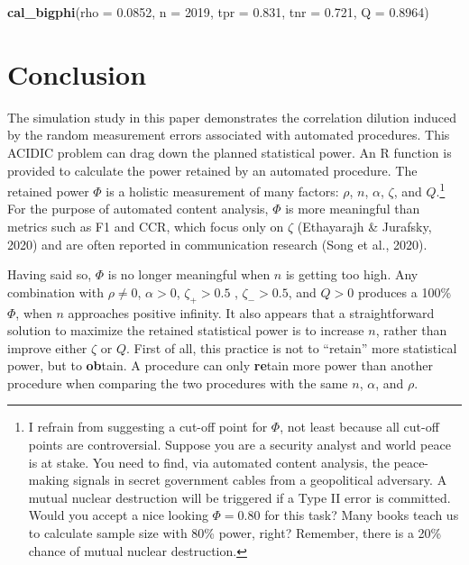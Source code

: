 \documentclass[english,man,floatsintext]{apa6}
\newenvironment{Shaded}{\begin{snugshade}}{\end{snugshade}}
\newcommand{\DataTypeTok}[1]{\textcolor[rgb]{0.13,0.29,0.53}{#1}}
\newcommand{\DecValTok}[1]{\textcolor[rgb]{0.00,0.00,0.81}{#1}}
\newcommand{\FloatTok}[1]{\textcolor[rgb]{0.00,0.00,0.81}{#1}}
\newcommand{\KeywordTok}[1]{\textcolor[rgb]{0.13,0.29,0.53}{\textbf{#1}}}
\newcommand{\NormalTok}[1]{#1}
\begin{document}
\begin{Shaded}
\begin{Highlighting}[]
\KeywordTok{cal_bigphi}\NormalTok{(}\DataTypeTok{rho =} \FloatTok{0.0852}\NormalTok{, }\DataTypeTok{n =} \DecValTok{2019}\NormalTok{,}
           \DataTypeTok{tpr =} \FloatTok{0.831}\NormalTok{, }\DataTypeTok{tnr =} \FloatTok{0.721}\NormalTok{,}
           \DataTypeTok{Q =} \FloatTok{0.8964}\NormalTok{)}
\end{Highlighting}
\end{Shaded}

\hypertarget{conclusion}{%
\section{Conclusion}\label{conclusion}}

The simulation study in this paper demonstrates the correlation dilution induced by the random measurement errors associated with automated procedures. This ACIDIC problem can drag down the planned statistical power. An R function is provided to calculate the power retained by an automated procedure. The retained power \(\Phi\) is a holistic measurement of many factors: \(\rho\), \(n\), \(\alpha\), \(\zeta\), and \(Q\).\footnote{I refrain from suggesting a cut-off point for \(\Phi\), not least because all cut-off points are controversial. Suppose you are a security analyst and world peace is at stake. You need to find, via automated content analysis, the peace-making signals in secret government cables from a geopolitical adversary. A mutual nuclear destruction will be triggered if a Type II error is committed. Would you accept a nice looking \(\Phi = 0.80\) for this task? Many books teach us to calculate sample size with 80\% power, right? Remember, there is a 20\% chance of mutual nuclear destruction.} For the purpose of automated content analysis, \(\Phi\) is more meaningful than metrics such as F1 and CCR, which focus only on \(\zeta\) (Ethayarajh \& Jurafsky, 2020) and are often reported in communication research (Song et al., 2020).

Having said so, \(\Phi\) is no longer meaningful when \(n\) is getting too high. Any combination with \(\rho \ne 0\), \(\alpha > 0\), \(\zeta_{+} > 0.5\) , \(\zeta_{-} > 0.5\), and \(Q > 0\) produces a 100\% \(\Phi\), when \(n\) approaches positive infinity. It also appears that a straightforward solution to maximize the retained statistical power is to increase \(n\), rather than improve either \(\zeta\) or \(Q\). First of all, this practice is not to \enquote{retain} more statistical power, but to \textbf{ob}tain. A procedure can only \textbf{re}tain more power than another procedure when comparing the two procedures with the same \(n\), \(\alpha\), and \(\rho\).
\end{document}
